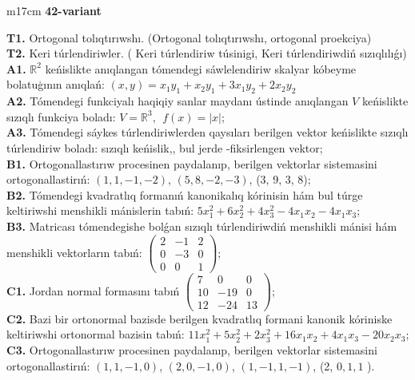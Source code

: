 \documentclass{article}
\begin{document}
\begin{tabular}{m{17cm}}
\textbf{42-variant}
\newline

\textbf{T1.} Ortogonal  tolıqtırıwshı. (Ortogonal tolıqtırıwshı,  ortogonal proekciya) \\
\textbf{T2.} Keri túrlendiriwler. ( Keri túrlendiriw túsinigi,   Keri túrlendiriwdiń sızıqlılıǵı) \\
\textbf{A1.} \(\mathbb{R}^{2}\) keńislikte anıqlangan tómendegi sáwlelendiriw skalyar kóbeyme bolatuģının anıqlań: \((x,y) = x_{1}y_{1} + x_{2}y_{1} + 3x_{1}y_{2} + 2x_{2}y_{2}\) \\
\textbf{A2.} Tómendegi funkciyalı haqiqiy sanlar maydanı ústinde anıqlangan \(V\) keńislikte sızıqlı funkciya boladı: \(V = \mathbb{R}^{3},\ \ f(x) = |x|\); \\
\textbf{A3.} Tómendegi sáykes túrlendiriwlerden qaysıları berilgen vektor keńislikte sızıqlı túrlendiriw boladı: sızıqlı keńislik,, bul jerde -fiksirlengen vektor; \\
\textbf{B1.} Ortogonallastırıw procesinen paydalanıp, berilgen vektorlar sistemasini ortogonallastirıń: \((1,1, - 1, - 2)\), \((5,8, - 2, - 3)\), (3, 9, 3, 8); \\
\textbf{B2.} Tómendegi kvadratlıq formanıń kanonikalıq kórinisin hám bul túrge keltiriwshi menshikli mánislerin tabıń: \(5x_{1}^{2} + 6x_{2}^{2} + 4x_{3}^{2} - 4x_{1}x_{2} - 4x_{1}x_{3}\); \\
\textbf{B3.} Matricası tómendegishe bolǵan sızıqlı túrlendiriwdiń menshikli mánisi hám menshikli vektorların tabıń: \(\begin{pmatrix} 2 & - 1 & 2 \\ 0 & - 3 & 0 \\ 0 & 0 & 1 \end{pmatrix}\); \\
\textbf{C1.} Jordan normal formasını tabıń \(\begin{pmatrix} 7 & 0 & 0 \\ 10 & - 19 & 0 \\ 12 & - 24 & 13 \end{pmatrix}\); \\
\textbf{C2.} Bazi bir ortonormal bazisde berilgen kvadratlıq formani kanonik kóriniske keltiriwshi ortonormal bazisin tabıń: \(11x_{1}^{2} + 5x_{2}^{2} + 2x_{3}^{2} + 16x_{1}x_{2} + 4x_{1}x_{3} - 20x_{2}x_{3}\); \\
\textbf{C3.} Ortogonallastırıw procesinen paydalanıp, berilgen vektorlar sistemasini ortogonallastirıń: \((1,1, - 1,0)\), \((2,0, - 1,0)\), \((1, - 1,1, - 1)\), (2, \(0,1,1\) ). \\

\end{tabular}
\vspace{1cm}
\end{document}
